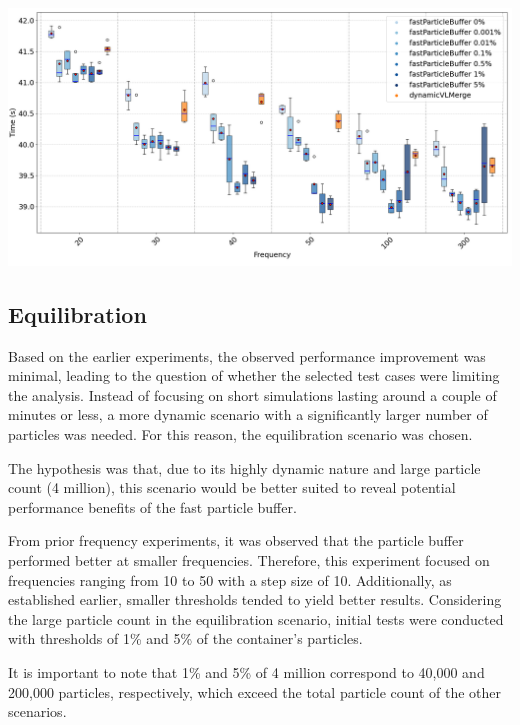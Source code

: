 \begin{center}
    \includegraphics[width=\linewidth]{graphs/percentage_vlcc08.png}
    \label{fig:percentage_falling}
\end{center}



\subsection{Equilibration}
 
Based on the earlier experiments, the observed performance improvement was minimal, leading to the question of whether the selected test cases were limiting the analysis. Instead of focusing on short simulations lasting around a couple of minutes or less, a more dynamic scenario with a significantly larger number of particles was needed. For this reason, the equilibration scenario was chosen.

The hypothesis was that, due to its highly dynamic nature and large particle count (4 million), this scenario would be better suited to reveal potential performance benefits of the fast particle buffer.

From prior frequency experiments, it was observed that the particle buffer performed better at smaller frequencies. Therefore, this experiment focused on frequencies ranging from 10 to 50 with a step size of 10. Additionally, as established earlier, smaller thresholds tended to yield better results. Considering the large particle count in the equilibration scenario, initial tests were conducted with thresholds of 1\% and 5\% of the container's particles. 

It is important to note that 1\% and 5\% of 4 million correspond to 40,000 and 200,000 particles, respectively, which exceed the total particle count of the other scenarios.

